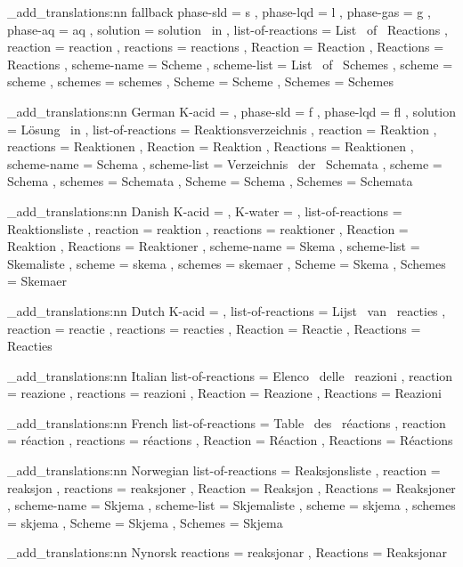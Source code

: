 
\chemmacros_add_translations:nn {fallback} {
  phase-sld   = s ,
  phase-lqd   = l ,
  phase-gas   = g ,
  phase-aq    = aq ,
  solution    = solution~ in ,
  list-of-reactions = List~ of~ Reactions ,
  reaction    = reaction ,
  reactions   = reactions ,
  Reaction    = Reaction ,
  Reactions   = Reactions ,
  scheme-name = Scheme ,
  scheme-list = List~ of~ Schemes ,
  scheme      = scheme ,
  schemes     = schemes ,
  Scheme      = Scheme ,
  Schemes     = Schemes
}

\chemmacros_add_translations:nn {German} {
  K-acid      =  ,
  phase-sld   = f ,
  phase-lqd   = f\/l ,
  solution    = L\"osung~ in ,
  list-of-reactions = Reaktionsverzeichnis ,
  reaction    = Reaktion ,
  reactions   = Reaktionen ,
  Reaction    = Reaktion ,
  Reactions   = Reaktionen ,
  scheme-name = Schema ,
  scheme-list = Verzeichnis~ der~ Schemata ,
  scheme      = Schema ,
  schemes     = Schemata ,
  Scheme      = Schema ,
  Schemes     = Schemata
}

\chemmacros_add_translations:nn {Danish} {
  K-acid      =  ,
  K-water     =  ,
  list-of-reactions = Reaktionsliste ,
  reaction    = reaktion ,
  reactions   = reaktioner ,
  Reaction    = Reaktion ,
  Reactions   = Reaktioner ,
  scheme-name = Skema ,
  scheme-list = Skemaliste ,
  scheme      = skema ,
  schemes     = skemaer ,
  Scheme      = Skema ,
  Schemes     = Skemaer
}

\chemmacros_add_translations:nn {Dutch} {
  K-acid      =  ,
  list-of-reactions = Lijst~ van~ reacties ,
  reaction    = reactie ,
  reactions   = reacties ,
  Reaction    = Reactie ,
  Reactions   = Reacties
}

\chemmacros_add_translations:nn {Italian} {
  list-of-reactions = Elenco~ delle~ reazioni ,
  reaction    = reazione ,
  reactions   = reazioni ,
  Reaction    = Reazione ,
  Reactions   = Reazioni
}

\chemmacros_add_translations:nn {French} {
  list-of-reactions = Table~ des~ r\'{e}actions ,
  reaction    = r\'{e}action ,
  reactions   = r\'{e}actions ,
  Reaction    = R\'{e}action ,
  Reactions   = R\'{e}actions
}

\chemmacros_add_translations:nn {Norwegian} {
  list-of-reactions = Reaksjonsliste ,
  reaction    = reaksjon ,
  reactions   = reaksjoner ,
  Reaction    = Reaksjon ,
  Reactions   = Reaksjoner ,
  scheme-name = Skjema ,
  scheme-list = Skjemaliste ,
  scheme      = skjema ,
  schemes     = skjema ,
  Scheme      = Skjema ,
  Schemes     = Skjema
}

\chemmacros_add_translations:nn {Nynorsk} {
  reactions   = reaksjonar ,
  Reactions   = Reaksjonar
}

\ChemModuleEnd
